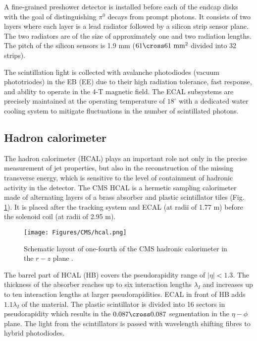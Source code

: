 A fine-grained preshower detector is installed before each of the endcap disks with the goal of distinguishing $\pi^0$ decays from prompt photons. It consists of two layers where each layer is a lead radiator followed by a silicon strip sensor plane. The two radiators are of the size of approximately one and two radiation lengths. The pitch of the silicon sensors is 1.9 mm ($61\cross61 \text{ mm}^2$ divided into 32 strips).  

The scintillation light is collected with avalanche photodiodes (vacuum phototriodes) in the EB (EE) due to their high radiation tolerance, fast response, and ability to operate in the 4-T magnetic field. The ECAL subsystems are precisely maintained at the operating temperature of $18^\circ$ with a dedicated water cooling system to mitigate fluctuations in the number of scintillated photons. 

\subsection{Hadron calorimeter}\label{sec:hcal}
The hadron calorimeter (HCAL) plays an important role not only in the precise measurement of jet properties, but also in the reconstruction of the missing transverse energy, which is sensitive to the level of containment of hadronic activity in the detector. The CMS HCAL is a hermetic sampling calorimeter made of alternating layers of a brass absorber and plastic scintillator tiles (Fig. \ref{fig:hcal}). It is placed after the tracking system and ECAL (at radii of 1.77 m) before the solenoid coil (at radii of 2.95 m).

\begin{figure}[h!]
    \centering
    \texttt{[image: Figures/CMS/hcal.png]}
    \caption{Schematic layout of one-fourth of the CMS hadronic calorimeter in the $r-z$ plane \cite{CMS:2008xjf}.}
    \label{fig:hcal}
\end{figure}

The barrel part of HCAL (HB) covers the pseudorapidity range of $|\eta| < 1.3$. The thickness of the absorber reaches up to six interaction lengths $\lambda_I$ and increases up to ten interaction lengths at larger pseudorapidities. ECAL in front of HB adds $1.1 \lambda_I$ of the material. The plastic scintillator is divided into 16 sectors in pseudorapidity which results in the $0.087 \cross 0.087$ segmentation in the $\eta-\phi$ plane. The light from the scintillators is passed with wavelength shifting fibres to hybrid photodiodes.

